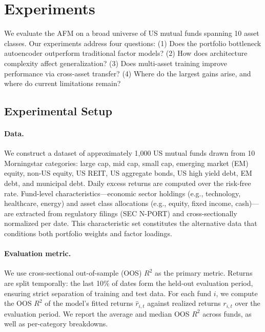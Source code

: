 
\section{Experiments}\label{sec:experiments}

We evaluate the AFM on a broad universe of US mutual funds spanning 10 asset classes. Our experiments address four questions: (1) Does the portfolio bottleneck autoencoder outperform traditional factor models? (2) How does architecture complexity affect generalization? (3) Does multi-asset training improve performance via cross-asset transfer? (4) Where do the largest gains arise, and where do current limitations remain?

\subsection{Experimental Setup}\label{sec:exp_setup}

\paragraph{Data.}
We construct a dataset of approximately 1,000 US mutual funds drawn from 10 Morningstar categories: large cap, mid cap, small cap, emerging market (EM) equity, non-US equity, US REIT, US aggregate bonds, US high yield debt, EM debt, and municipal debt. Daily excess returns are computed over the risk-free rate. Fund-level characteristics---economic sector holdings (e.g., technology, healthcare, energy) and asset class allocations (e.g., equity, fixed income, cash)---are extracted from regulatory filings (SEC N-PORT) and cross-sectionally normalized per date. This characteristic set constitutes the alternative data that conditions both portfolio weights and factor loadings.

\paragraph{Evaluation metric.}
We use cross-sectional out-of-sample (OOS) $R^2$ as the primary metric. Returns are split temporally: the last 10\% of dates form the held-out evaluation period, ensuring strict separation of training and test data. For each fund $i$, we compute the OOS $R^2$ of the model's fitted returns $\hat{r}_{i,t}$ against realized returns $r_{i,t}$ over the evaluation period. We report the average and median OOS $R^2$ across funds, as well as per-category breakdowns.

